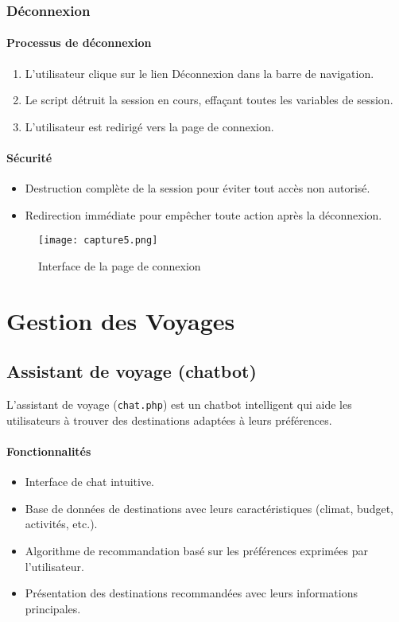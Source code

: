 \documentclass[a4paper,12pt]{article}
\begin{document}
\subsubsection{Déconnexion}

\paragraph{Processus de déconnexion}
\begin{enumerate}
  \item L'utilisateur clique sur le lien \og Déconnexion \fg{} dans la barre de navigation.
  \item Le script détruit la session en cours, effaçant toutes les variables de session.
  \item L'utilisateur est redirigé vers la page de connexion.
\end{enumerate}

\paragraph{Sécurité}
\begin{itemize}
  \item Destruction complète de la session pour éviter tout accès non autorisé.
  \item Redirection immédiate pour empêcher toute action après la déconnexion.
\end{itemize}
\begin{figure}[H]
  \centering
  \texttt{[image: capture5.png]}
  \caption{Interface de la page de connexion}
\end{figure}
\section{Gestion des Voyages}
\subsection{Assistant de voyage (chatbot)}

L'assistant de voyage (\texttt{chat.php}) est un chatbot intelligent qui aide les utilisateurs à trouver des destinations adaptées à leurs préférences.

\paragraph{Fonctionnalités}
\begin{itemize}
  \item Interface de chat intuitive.
  \item Base de données de destinations avec leurs caractéristiques (climat, budget, activités, etc.).
  \item Algorithme de recommandation basé sur les préférences exprimées par l'utilisateur.
  \item Présentation des destinations recommandées avec leurs informations principales.
\end{itemize}
\end{document}
